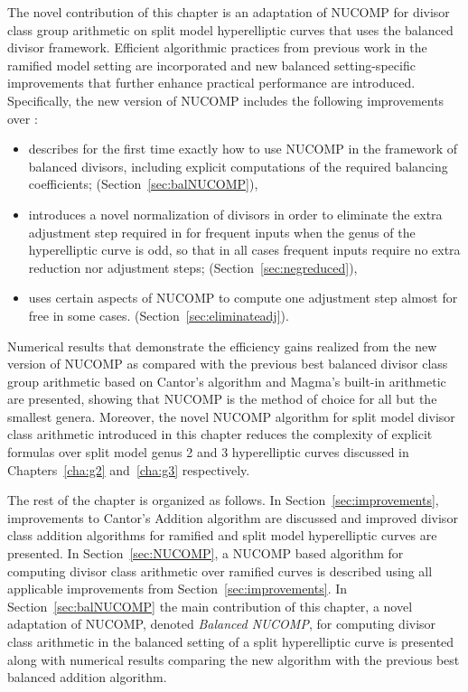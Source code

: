 The novel contribution of this chapter is an adaptation of NUCOMP for divisor
class group arithmetic on split model hyperelliptic curves that uses the
balanced divisor framework. Efficient algorithmic practices from previous work
in the ramified model setting are incorporated and new balanced setting-specific
improvements that further enhance practical performance are introduced.
Specifically, the new version of NUCOMP includes the following improvements over
\cite{jacobson_fast_2007}:
\begin{itemize}
    \item describes for the first time exactly how to use NUCOMP in the
    framework of balanced divisors, including explicit computations of the
    required balancing coefficients; (Section~\ref{sec:balNUCOMP}),
    \item introduces a novel normalization of divisors in order to eliminate the
    extra adjustment step required in \cite{jacobson_fast_2007} for frequent
    inputs when the genus of the hyperelliptic curve is odd, so that in all
    cases frequent inputs require no extra reduction nor adjustment steps;
    (Section~\ref{sec:negreduced}),
    \item uses certain aspects of NUCOMP to compute one adjustment step almost
    for free in some cases. (Section~\ref{sec:eliminateadj}). 
\end{itemize} 
Numerical results that demonstrate the efficiency gains realized from the new
version of NUCOMP as compared with the previous best balanced divisor class
group arithmetic based on Cantor's algorithm and Magma's built-in arithmetic are
presented, showing that NUCOMP is the method of choice for all but the smallest
genera. Moreover, the novel NUCOMP algorithm for split model divisor class
arithmetic introduced in this chapter reduces the complexity of explicit
formulas over split model genus 2 and 3 hyperelliptic curves discussed in
Chapters~\ref{cha:g2} and~\ref{cha:g3} respectively.

The rest of the chapter is organized as follows.  In
Section~\ref{sec:improvements}, improvements to Cantor's Addition algorithm are
discussed and improved divisor class addition algorithms for ramified and split
model hyperelliptic curves are presented. In Section~\ref{sec:NUCOMP}, a NUCOMP
based algorithm for computing divisor class arithmetic over ramified curves is
described using all applicable improvements from Section~\ref{sec:improvements}.
In Section~\ref{sec:balNUCOMP} the main contribution of this chapter, a novel
adaptation of NUCOMP, denoted \emph{Balanced NUCOMP}, for computing divisor
class arithmetic in the balanced setting of a split hyperelliptic curve is
presented along with numerical results comparing the new algorithm with the
previous best balanced addition algorithm.


